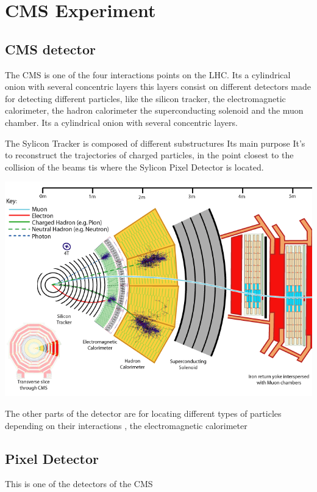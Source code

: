 \chapter{CMS Experiment}
\label{ch2}

\section{CMS detector}

The CMS is one of the four interactions points on the LHC. Its a cylindrical onion with several concentric layers this layers consist on different detectors made for detecting different particles, like the silicon tracker, the electromagnetic calorimeter, the hadron calorimeter the superconducting solenoid and the muon chamber. Its a cylindrical onion with several concentric layers.   \cite{CMS}

The Sylicon Tracker is composed of different substructures Its main purpose It's to reconstruct the trajectories of charged particles, in the point closest to the collision of the beams tis where the Sylicon Pixel Detector is located. %

\includegraphics[scale=0.35]{cms.png}

The other parts of the detector are for locating different types of particles depending on their interactions , the electromagnetic calorimeter 


\section{Pixel Detector}

This is one of the detectors of the CMS \cite{pxd}

